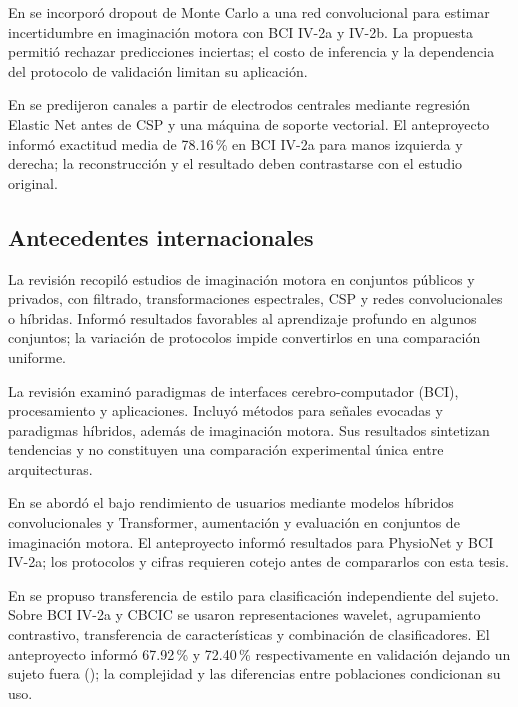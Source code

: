 En \cite{milanes2021monte} se incorporó dropout de Monte Carlo a una red convolucional para estimar incertidumbre en imaginación motora con BCI IV-2a y IV-2b. La propuesta permitió rechazar predicciones inciertas; el costo de inferencia y la dependencia del protocolo de validación limitan su aplicación.

En \cite{gomez2025prediction} se predijeron canales a partir de electrodos centrales mediante regresión Elastic Net antes de CSP y una máquina de soporte vectorial. El anteproyecto informó exactitud media de 78.16\,\% en BCI IV-2a para manos izquierda y derecha; la reconstrucción y el resultado deben contrastarse con el estudio original.

\subsection{Antecedentes internacionales}
La revisión \cite{alsaegh2021review} recopiló estudios de imaginación motora en conjuntos públicos y privados, con filtrado, transformaciones espectrales, CSP y redes convolucionales o híbridas. Informó resultados favorables al aprendizaje profundo en algunos conjuntos; la variación de protocolos impide convertirlos en una comparación uniforme.

La revisión \cite{yadav2025decoding} examinó paradigmas de interfaces cerebro-computador (BCI), procesamiento y aplicaciones. Incluyó métodos para señales evocadas y paradigmas híbridos, además de imaginación motora. Sus resultados sintetizan tendencias y no constituyen una comparación experimental única entre arquitecturas.

En \cite{pfeffer2026transformer} se abordó el bajo rendimiento de usuarios mediante modelos híbridos convolucionales y Transformer, aumentación y evaluación en conjuntos de imaginación motora. El anteproyecto informó resultados para PhysioNet y BCI IV-2a; los protocolos y cifras requieren cotejo antes de compararlos con esta tesis.

En \cite{han2026source} se propuso transferencia de estilo para clasificación independiente del sujeto. Sobre BCI IV-2a y CBCIC se usaron representaciones wavelet, agrupamiento contrastivo, transferencia de características y combinación de clasificadores. El anteproyecto informó 67.92\,\% y 72.40\,\% respectivamente en validación dejando un sujeto fuera (\loso{}); la complejidad y las diferencias entre poblaciones condicionan su uso.

